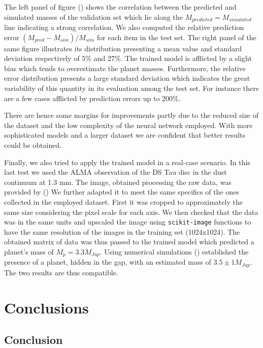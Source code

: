 \documentclass[a4paper,10pt]{report}
\begin{document}
The left panel of figure () shows the correlation between the predicted and simulated masses of the validation set which
lie along the $M_{predicted} = M_{simulated}$ line indicating a strong correlation.
We also computed the relative prediction error $(M_{pred} - M_{sim})/M_{sim}$ for each item
in the test set. The right panel of the same figure illustrates its distribution
presenting a mean value and standard deviation respectively of 5\% and 27\%.
The trained model is afflicted by a slight bias which tends to overestimate the planet masses.
Furthermore, the relative error distribution presents a large standard deviation which indicates the great
variability of this quantity in its evaluation among the test set. For instance there are a few cases afflicted by
prediction errors up to 200\%.

There are hence some margins for improvements partly due to the reduced size of
the dataset and the low complexity of the neural network employed. With more sophisticated models and
a larger dataset we are confident that better results could be obtained.

Finally, we also tried to apply the trained model in a real-case scenario. In this last test we used
the ALMA observation of the DS Tau disc in the dust continuum at 1.3 mm.
The image, obtained processing the raw data, was provided by ()
We further adapted it to meet the same specifics of the ones collected in the employed dataset.
First it was cropped to
approximately the same size considering the pixel scale for each axis.
We then checked that the data was in the same units and upscaled the image using
\lstinline{scikit-image} functions to have the same resolution of the images in the training set (1024x1024).
The obtained matrix of data was thus passed to the trained model which predicted a planet's mass of $M_p = 3.3 M_{Jup}$.
Using numerical simulations () established the presence of a planet, hidden in the gap, with an estimated
mass of $3.5 \pm 1 M_{Jup}$. The two results are thus compatible.

\chapter{Conclusions}
\section{Conclusion}
\end{document}
